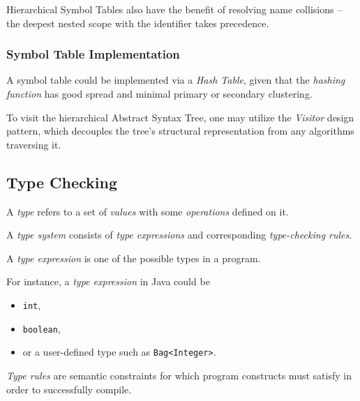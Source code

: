 \begin{remark}
    Hierarchical Symbol Tables also have the benefit of resolving name collisions -- the deepest nested scope with the identifier takes precedence.
\end{remark}

\subsubsection{Symbol Table Implementation}

A symbol table could be implemented via a \textit{Hash Table}, given that the \textit{hashing function} has good spread and minimal primary or secondary clustering.

To visit the hierarchical Abstract Syntax Tree, one may utilize the \textit{Visitor} design pattern, which decouples the tree's structural representation from any algorithms traversing it.

\subsection{Type Checking}

\begin{definition}[Type]
    A \textit{type} refers to a set of \textit{values} with some \textit{operations} defined on it.
\end{definition}

\begin{definition}
    A \textit{type system} consists of \textit{type expressions} and corresponding \textit{type-checking rules}.
\end{definition}

\begin{definition}
    A \textit{type expression} is one of the possible types in a program.
\end{definition}

\begin{example}
    For instance, a \textit{type expression} in Java could be
    \begin{itemize}
        \item \texttt{int},
        \item \texttt{boolean},
        \item or a user-defined type such as \texttt{Bag<Integer>}.
    \end{itemize}
\end{example}

\begin{definition}
    \textit{Type rules} are semantic constraints for which program constructs must satisfy in order to successfully compile.
\end{definition}

